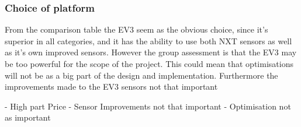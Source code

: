 \subsubsection{Choice of platform}
From the comparison table the EV3 seem as the obvious choice, since it's superior in all categories, and it has the ability to use both NXT sensors as well as it's own improved sensors. However the group assessment is that the EV3 may be too powerful for the scope of the project. This could mean that optimisations will not be as a big part of the design and implementation. Furthermore the improvements made to the EV3 sensors not that important


- High part Price
- Sensor Improvements not that important
- Optimisation not as important




